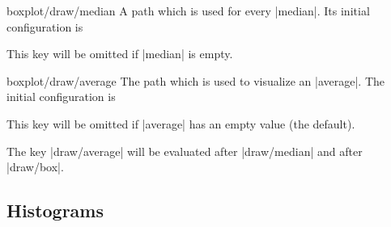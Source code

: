 \begin{pgfplotscodekey}{boxplot/draw/median}
    A path which is used for every |median|. Its initial configuration is
\begin{codeexample}
\end{codeexample}
    This key will be omitted if |median| is empty.
\end{pgfplotscodekey}

\begin{pgfplotscodekey}{boxplot/draw/average}
    The path which is used to visualize an |average|. The initial configuration is
\begin{codeexample}
\makeatletter
{}
\makeatother
\end{codeexample}
    This key will be omitted if |average| has an empty value (the default).

    The key |draw/average| will be evaluated after |draw/median| and after
    |draw/box|.
\end{pgfplotscodekey}

\endgroup


\subsection{Histograms}
\label{sec:histograms}

